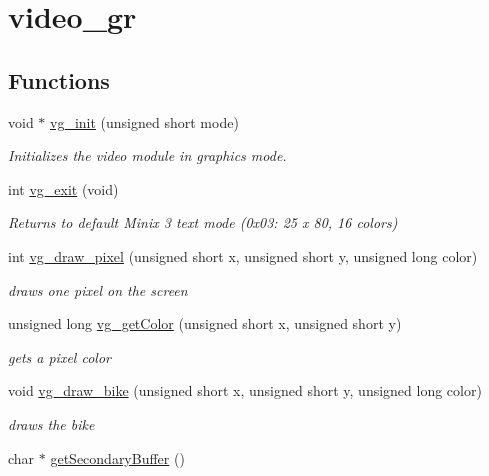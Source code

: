 \hypertarget{group__video__gr}{}\section{video\+\_\+gr}
\label{group__video__gr}
\subsection*{Functions}
\begin{DoxyCompactItemize}
\item 
void $\ast$ \hyperlink{group__video__gr_gacef21667c79365d57a084bed994c2189}{vg\+\_\+init} (unsigned short mode)
\begin{DoxyCompactList}\small\item\em Initializes the video module in graphics mode. \end{DoxyCompactList}\item 
int \hyperlink{group__video__gr_ga42f593e6656f1a978315aff02b1bcebf}{vg\+\_\+exit} (void)
\begin{DoxyCompactList}\small\item\em Returns to default Minix 3 text mode (0x03\+: 25 x 80, 16 colors) \end{DoxyCompactList}\item 
int \hyperlink{group__video__gr_ga511311dbbd19f3b1f0c99111eee21b9a}{vg\+\_\+draw\+\_\+pixel} (unsigned short x, unsigned short y, unsigned long color)
\begin{DoxyCompactList}\small\item\em draws one pixel on the screen \end{DoxyCompactList}\item 
unsigned long \hyperlink{group__video__gr_ga21e5df0f0f8fe4b0fa3841550da32c62}{vg\+\_\+get\+Color} (unsigned short x, unsigned short y)
\begin{DoxyCompactList}\small\item\em gets a pixel color \end{DoxyCompactList}\item 
void \hyperlink{group__video__gr_ga58144867b7ba0851547e9a599b05107b}{vg\+\_\+draw\+\_\+bike} (unsigned short x, unsigned short y, unsigned long color)
\begin{DoxyCompactList}\small\item\em draws the bike \end{DoxyCompactList}\item 
char $\ast$ \hyperlink{group__video__gr_gaedd0b1a041eee82028cf2c5d581ee0a6}{get\+Secondary\+Buffer} ()

\end{DoxyCompactItemize}
